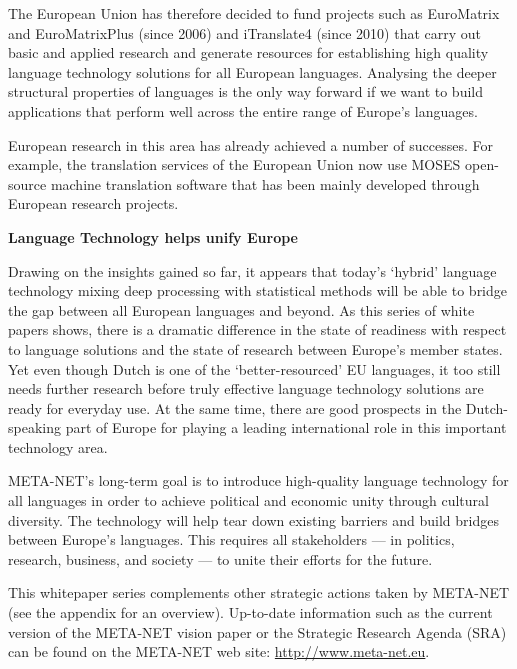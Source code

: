 \documentclass{scrartcl}
\newcommand{\boxtext}[1]{
  \begin{center}
    {\textbf{#1}}
  \end{center}
}
\begin{document}
\begin{Parallel}[c]{70mm}{70mm}
{    The European Union has therefore decided to fund projects such as EuroMatrix and EuroMatrixPlus (since 2006) and iTranslate4 (since 2010) that carry out basic and applied research and generate resources for establishing high quality language technology solutions for all European languages. Analysing the deeper structural properties of languages is the only way forward if we want to build applications that perform well across the entire range of Europe's languages.

    European research in this area has already achieved a number of successes. For example, the translation services of the European Union now use MOSES open-source machine translation software that has been mainly developed through European research projects. 


    \boxtext{Language Technology helps unify Europe}

    Drawing on the insights gained so far, it appears that today's `hybrid' language technology mixing deep processing with statistical methods will be able to bridge the gap between all European languages and beyond. As this series of white papers shows, there is a dramatic difference in the state of readiness with respect to language solutions and the state of research between Europe's member states. Yet even though Dutch is one of the `better-resourced' EU languages, it too still needs further research before truly effective language technology solutions are ready for everyday use. At the same time, there are good prospects in the Dutch-speaking part of Europe for playing a leading international role in this important technology area.

    META-NET's long-term goal is to introduce high-quality language technology for all languages in order to achieve political and economic unity through cultural diversity. The technology will help tear down existing barriers and build bridges between Europe's languages. This requires all stakeholders --- in politics, research, business, and society --- to unite their efforts for the future.

    This whitepaper series complements other strategic actions taken by META-NET (see the appendix for an overview). Up-to-date information such as the current version of the META-NET vision paper \cite{MNVision} or the Strategic Research Agenda (SRA) can be found on the META-NET web site: \url{http://www.meta-net.eu}.

  }

  \ParallelPar



\end{Parallel}
\end{document}
